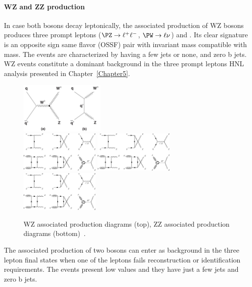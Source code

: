 \paragraph{WZ and ZZ production}\label{sec:c4wz_zz}
In case both bosons decay leptonically, the associated production of
WZ bosons produces three prompt leptons ($\PZ \rightarrow \ell^{+}
\ell^{-}$, $\PW \rightarrow \ell \nu$) and \ptmiss.
Its clear signature is an opposite sign same flavor (OSSF) pair with
invariant mass compatible with \PZ mass. The events are characterized by
having a few jets or none, and zero b jets.
WZ events
constitute a dominant background in the three prompt leptons HNL
analysis presented in Chapter~\ref{Chapter5}.

\begin{figure}[h!]
\centering
  \includegraphics[clip,trim=0.cm 0.5cm 0cm 0cm, height =2.5cm]{Figures/c4/dia/wz.jpeg}\\
  \includegraphics[clip,trim=0.cm 6cm 15cm 0cm, height =
  2cm]{Figures/c4/dia/Lowest-order-Feynman-diagrams-for-ZZ-production.jpeg}
\includegraphics[clip,trim=0.cm 0.cm 15cm 6.5cm, height =2cm]{Figures/c4/dia/Lowest-order-Feynman-diagrams-for-ZZ-production.jpeg}
  \includegraphics[clip,trim=15.cm 6.cm 0cm 0cm, height =2cm]{Figures/c4/dia/Lowest-order-Feynman-diagrams-for-ZZ-production.jpeg}
  \caption{WZ associated production diagrams (top), ZZ associated
    production diagrams (bottom)~\cite{diagram}.}
  \label{fig:c41}
\end{figure}
The associated production of two \PZ bosons can enter as background in
the three lepton final states when one of the leptons fails
reconstruction or identification requirements. The events present low \ptmiss
values and they have just a few jets and zero b jets. 

